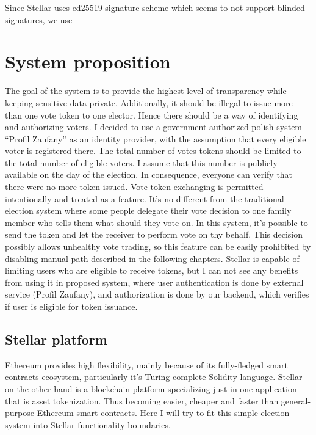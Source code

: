 \documentclass[runningheads]{llncs}
\begin{document}
Since Stellar uses ed25519 signature scheme which seems to not support blinded signatures, we use 



\section{System proposition}

The goal of the system is to provide the highest level of transparency while keeping sensitive data private. Additionally, it should be illegal to issue more than one vote token to one elector. Hence there should be a way of identifying and authorizing voters. I decided to use a government authorized polish system
“Profil Zaufany” as an identity provider, with the assumption that every eligible voter is registered there. The total number of votes tokens should be limited to the total number of eligible voters. I assume that this number is publicly available on the day of the election. In consequence, everyone can verify that there were no more token issued. Vote token exchanging is permitted intentionally and treated as a feature. It’s no different from the traditional election system where some people delegate their vote decision to one family member who tells them what should they vote on. In this system, it’s possible to send the token and let the receiver to perform vote on thy behalf. This decision possibly allows unhealthy vote trading, so this feature can be easily prohibited by disabling manual path described in the following chapters. Stellar is capable of limiting users who are eligible to receive tokens, but I can not see any benefits from using it in proposed system, where user authentication is done by external service (Profil Zaufany), and authorization is done by our backend, which verifies if user is eligible for token issuance.

\subsection{Stellar platform}
Ethereum provides high flexibility, mainly because of its fully-fledged smart contracts ecosystem, particularly it’s Turing-complete Solidity language. Stellar on the other hand is a blockchain platform specializing just in one application that is asset tokenization. Thus becoming easier, cheaper and faster than general-purpose Ethereum smart contracts. Here I will try to fit this simple election system into Stellar functionality boundaries.
\end{document}
